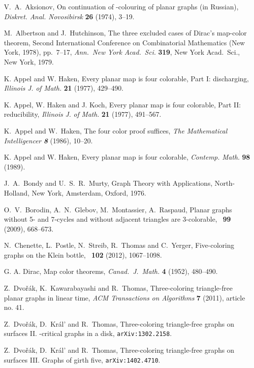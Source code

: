 \documentclass{article}
\begin{document}
\begin{thebibliography}{99}
 V.~A.~Aksionov,
On continuation of -colouring of planar graphs (in Russian),
{\em Diskret. Anal.  Novosibirsk} {\bf 26} (1974), 3--19.

 M.~Albertson and J.~Hutchinson,
The three excluded cases of Dirac's map-color theorem,
 Second International Conference on Combinatorial Mathematics
(New York, 1978),  pp.~7--17,
{\it Ann.\ New York Acad.\ Sci.} {\bf 319}, New York Acad.\ Sci.,
New York, 1979.

 K. Appel and W. Haken,
Every planar map is four colorable, Part I: discharging,
{\it Illinois J. of Math.} {\bf 21} (1977), 429--490.

 K. Appel, W. Haken and J. Koch,
Every planar map is four colorable, Part II: reducibility,
{\it Illinois J. of Math.} {\bf 21} (1977), 491--567.

 K.~Appel and W.~Haken,
The four color proof suffices,
{\it The Mathematical Intelligencer \bf 8} (1986), 10--20.

 K. Appel and W. Haken,
Every planar map is four colorable,
{\it Contemp. Math.} {\bf 98} (1989).

 J.~A.~Bondy and U.~S.~R.~Murty,
Graph Theory with Applications,
North-Holland, New York, Amsterdam, Oxford, 1976.

 O.~V.~Borodin, A.~N.~Glebov, M.~Montassier, A.~Raspaud,
Planar graphs without 5- and 7-cycles and without adjacent triangles are 3-colorable,
\JCTB\ {\bf99} (2009), 668--673.

 N.~Chenette, L.~Postle, N.~Streib, R.~Thomas and C.~Yerger,
Five-coloring graphs on the Klein bottle,
\JCTB\ {\bf 102} (2012), 1067--1098.

 G. A. Dirac, Map color theorems,
{\it Canad.\ J.~Math.} {\bf 4} (1952), 480--490.

 Z.~Dvo\v{r}\'ak, K.~Kawarabayashi and R.~Thomas,
Three-coloring triangle-free planar graphs in linear time,
{\it ACM Transactions on Algorithms} {\bf 7} (2011), article no. 41.

 Z.~Dvo\v{r}\'ak, D.~Kr\'al' and R.~Thomas,
Three-coloring triangle-free graphs on surfaces II. 
-critical graphs in a disk, {\tt arXiv:1302.2158}.

 Z.~Dvo\v{r}\'ak, D.~Kr\'al' and R.~Thomas,
Three-coloring triangle-free graphs on surfaces III. Graphs of girth five, 
{\tt arXiv:1402.4710}.


\end{thebibliography}
\end{document}
